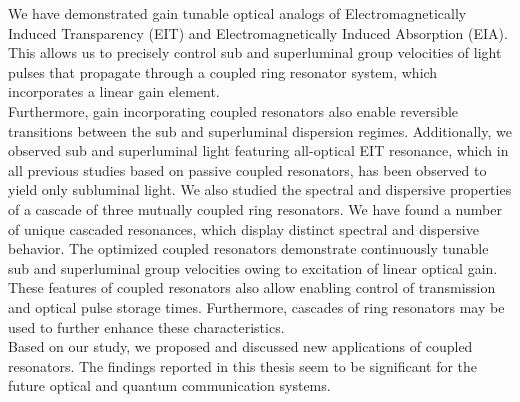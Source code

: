 We have demonstrated gain tunable optical analogs of Electromagnetically Induced Transparency (EIT) and Electromagnetically Induced Absorption (EIA). This allows us to precisely control sub and superluminal group velocities of light pulses that propagate through a coupled ring resonator system, which incorporates a linear gain element. \\

Furthermore, gain incorporating coupled resonators also enable reversible transitions between the sub and superluminal dispersion regimes. Additionally, we observed sub and superluminal light featuring all-optical EIT resonance, which in all previous studies based on passive coupled resonators, has been observed to yield only subluminal light. We also studied the spectral and dispersive properties of a cascade of three mutually coupled ring resonators. We have found a number of unique cascaded resonances, which display distinct spectral and dispersive behavior. The optimized coupled resonators demonstrate continuously tunable sub and superluminal group velocities owing to excitation of linear optical gain. These features of coupled resonators also allow enabling control of transmission and optical pulse storage times. Furthermore, cascades of ring resonators may be used to further enhance these characteristics.\\

Based on our study, we proposed and discussed new applications of coupled resonators. The findings reported in this thesis seem to be significant for the future optical and quantum communication systems.